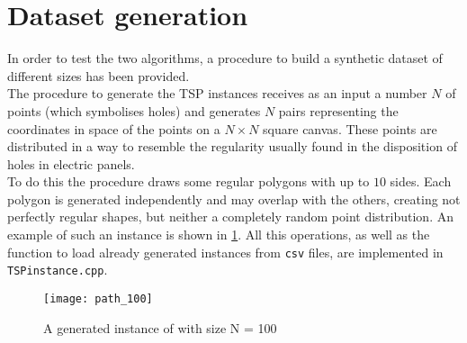 \section{Dataset generation}
\label{sec:datasetgen}
In order to test the two algorithms, a procedure to build a synthetic dataset of different sizes has been provided.\\ 
The procedure to generate the TSP instances receives as an input a number $N$ of points (which symbolises holes) and generates $N$ pairs representing the coordinates in space of the points on a $N\times N$ square canvas. These points are distributed in a way to resemble the regularity usually found in the disposition of holes in electric panels.\\ 
To do this the procedure draws some regular polygons with up to $10$ sides. Each polygon is generated independently and may overlap with the others, creating not perfectly regular shapes, but neither a completely random point distribution. An example of such an instance is shown in \cref{fig:dataexample}. All this operations, as well as the function to load already generated instances from \texttt{csv} files, are implemented in \texttt{TSPinstance.cpp}.

\begin{figure}[h]
	\centering
	\texttt{[image: path\_100]}
	\caption{A generated instance of with size N = 100}
	\label{fig:dataexample}
\end{figure}


